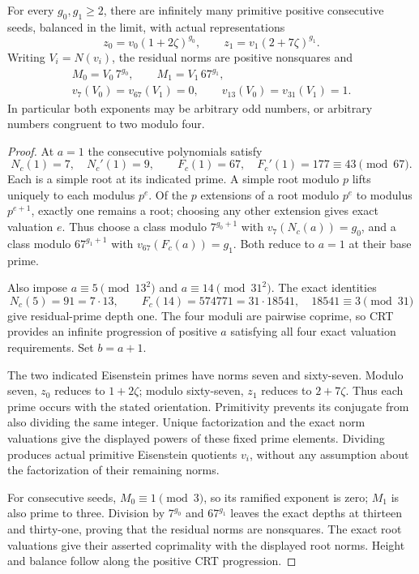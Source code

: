 \begin{theorem}\label{lp-actual}
For every $g_0,g_1\ge2$, there are infinitely many primitive positive
consecutive seeds, balanced in the limit, with actual representations
\[
 z_0=v_0(1+2\zeta)^{g_0},\qquad
 z_1=v_1(2+7\zeta)^{g_1}.
\]
Writing $V_i=N(v_i)$, the residual norms are positive nonsquares and
\begin{gather*}
 M_0=V_0\,7^{g_0},\qquad M_1=V_1\,67^{g_1},\\
 v_7(V_0)=v_{67}(V_1)=0,\qquad
 v_{13}(V_0)=v_{31}(V_1)=1.
\end{gather*}
In particular both exponents may be arbitrary odd numbers, or arbitrary
numbers congruent to two modulo four.
\end{theorem}
\begin{proof}
At $a=1$ the consecutive polynomials satisfy
\[
 N_c(1)=7,\quad N_c'(1)=9,\qquad
 F_c(1)=67,\quad F_c'(1)=177\equiv43\pmod{67}.
\]
Each is a simple root at its indicated prime. A simple root modulo
$p$ lifts uniquely to each modulus $p^e$. Of the $p$ extensions of
a root modulo $p^e$ to modulus $p^{e+1}$, exactly one remains a root;
choosing any other extension gives exact valuation $e$.
Thus choose a class modulo $7^{g_0+1}$ with
$v_7(N_c(a))=g_0$, and a class modulo $67^{g_1+1}$ with
$v_{67}(F_c(a))=g_1$. Both reduce to $a=1$ at their base prime.

Also impose $a\equiv5\pmod{13^2}$ and $a\equiv14\pmod{31^2}$.
The exact identities
\[
 N_c(5)=91=7\cdot13,\qquad
 F_c(14)=574771=31\cdot18541,\quad18541\equiv3\pmod{31}
\]
give residual-prime depth one. The four moduli are pairwise coprime,
so CRT provides an infinite progression of positive $a$ satisfying
all four exact valuation requirements. Set $b=a+1$.

The two indicated Eisenstein primes have norms seven and sixty-seven.
Modulo seven, $z_0$ reduces to $1+2\zeta$; modulo sixty-seven,
$z_1$ reduces to $2+7\zeta$. Thus each prime occurs with the stated
orientation. Primitivity prevents its conjugate from also dividing
the same integer. Unique factorization and the exact norm valuations
give the displayed powers of these fixed prime elements. Dividing
produces actual primitive Eisenstein quotients $v_i$, without any
assumption about the factorization of their remaining norms.

For consecutive seeds, $M_0\equiv1\pmod3$, so its ramified exponent
is zero; $M_1$ is also prime to three. Division by $7^{g_0}$ and
$67^{g_1}$ leaves the exact depths at thirteen and thirty-one, proving
that the residual norms are nonsquares. The exact root valuations
give their asserted coprimality with the displayed root norms.
Height and balance follow along the positive CRT progression.
\end{proof}

